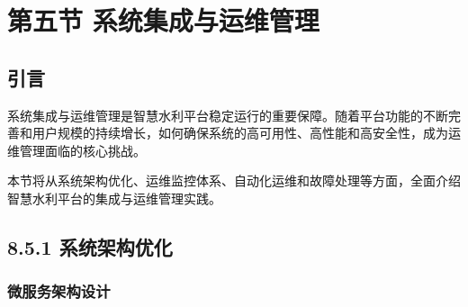 \section{第五节
系统集成与运维管理}\label{ux7b2cux4e94ux8282-ux7cfbux7edfux96c6ux6210ux4e0eux8fd0ux7ef4ux7ba1ux7406}

\subsection{引言}\label{ux5f15ux8a00}

系统集成与运维管理是智慧水利平台稳定运行的重要保障。随着平台功能的不断完善和用户规模的持续增长，如何确保系统的高可用性、高性能和高安全性，成为运维管理面临的核心挑战。

本节将从系统架构优化、运维监控体系、自动化运维和故障处理等方面，全面介绍智慧水利平台的集成与运维管理实践。

\subsection{8.5.1
系统架构优化}\label{ux7cfbux7edfux67b6ux6784ux4f18ux5316}

\subsubsection{微服务架构设计}\label{ux5faeux670dux52a1ux67b6ux6784ux8bbeux8ba1}

